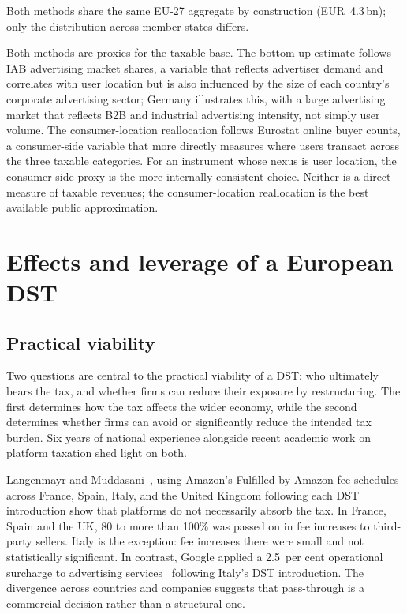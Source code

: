 \documentclass[../../main]{subfiles}
\begin{document}
Both methods share the same EU-27 aggregate by construction (EUR~4.3\,bn); only the distribution across member states differs.

Both methods are proxies for the taxable base.
The bottom-up estimate follows IAB advertising market shares, a variable that reflects advertiser demand and correlates with user location but is also influenced by the size of each country's corporate advertising sector; Germany illustrates this, with a large advertising market that reflects B2B and industrial advertising intensity, not simply user volume.
The consumer-location reallocation follows Eurostat online buyer counts, a consumer-side variable that more directly measures where users transact across the three taxable categories.
For an instrument whose nexus is user location, the consumer-side proxy is the more internally consistent choice.
Neither is a direct measure of taxable revenues; the consumer-location reallocation is the best available public approximation.


\section{Effects and leverage of a European DST}

\subsection{Practical viability}
\label{sec:effects:viability}

Two questions are central to the practical viability of a DST: who ultimately bears the tax, and whether firms can reduce their exposure by restructuring.
The first determines how the tax affects the wider economy, while the second determines whether firms can avoid or significantly reduce the intended tax burden.
Six years of national experience alongside recent academic work on platform taxation shed light on both.

Langenmayr and Muddasani~\citep{langenmayr_muddasani_2026}, using Amazon's Fulfilled by Amazon fee schedules across France, Spain, Italy, and the United Kingdom following each DST introduction show that platforms do not necessarily absorb the tax.
In France, Spain and the UK, 80 to more than 100\% was passed on in fee increases to third-party sellers.
Italy is the exception: fee increases there were small and not statistically significant.
In contrast, Google applied a 2.5~per cent operational surcharge to advertising services~\citep{olmastroni_2025} following Italy's DST introduction.
The divergence across countries and companies suggests that pass-through is a commercial decision rather than a structural one.
\end{document}
